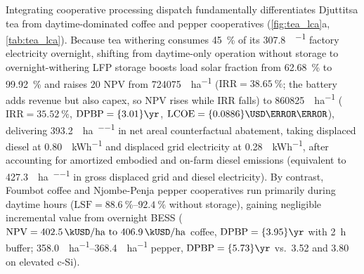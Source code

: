 \documentclass[preprint,12pt,a4paper]{elsarticle}
\begin{document}
Integrating cooperative processing dispatch fundamentally differentiates Djuttitsa tea from daytime-dominated coffee and pepper cooperatives (\cref{fig:tea_lca}a, \cref{tab:tea_lca}). Because tea withering consumes \qty{45}{\percent} of its \qty{307.8}{\MWh\per\yr} factory electricity overnight, shifting from daytime-only operation without storage to overnight-withering LFP storage boosts load solar fraction from \qty{62.68}{\percent} to \qty{99.92}{\percent} and raises \qty{20}{\yr} NPV from \qty{724075}{\USD\per\hectare} ($\mathrm{IRR} = \qty{38.65}{\percent}$; the battery adds revenue but also capex, so NPV rises while IRR falls) to \qty{860825}{\USD\per\hectare} ($\mathrm{IRR} = \qty{35.52}{\percent}$, $\mathrm{DPBP} = \qty{3.01}{\yr}$, $\mathrm{LCOE} = \qty{0.0886}{\USD\per\kWh}$), delivering \qty{393.2}{\tCOtwoe\per\hectare\per\yr} in net areal counterfactual abatement, taking displaced diesel at \qty{0.80}{\kgCOtwoe\per\kWh} and displaced grid electricity at \qty{0.28}{\kgCOtwoe\per\kWh}, after accounting for amortized embodied and on-farm diesel emissions (equivalent to \qty{427.3}{\tCOtwoe\per\hectare\per\yr} in gross displaced grid and diesel electricity). By contrast, Foumbot coffee and Njombe-Penja pepper cooperatives run primarily during daytime hours ($\mathrm{LSF} = \qtyrange{88.6}{92.4}{\percent}$ without storage), gaining negligible incremental value from overnight BESS ($\mathrm{NPV} = \qtyrange{402.5}{406.9}{\kUSD\per\hectare}$ coffee, $\mathrm{DPBP} = \qty{3.95}{\yr}$ with \qty{2}{\hour} buffer; \qtyrange{358.0}{368.4}{\kUSD\per\hectare} pepper, $\mathrm{DPBP} = \qty{5.73}{\yr}$ vs.\ \qty{3.52}{\yr} and \qty{3.80}{\yr} on elevated c-Si).
\end{document}
